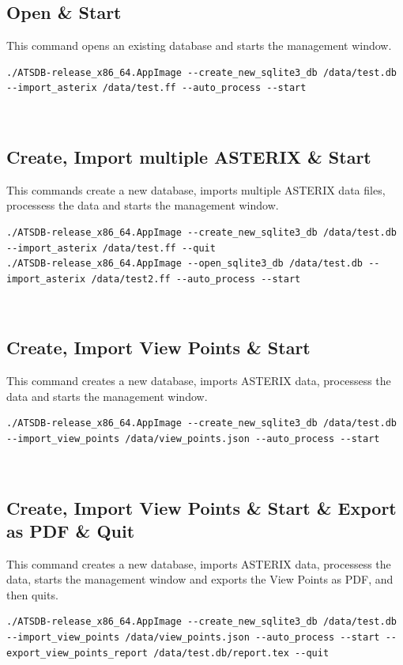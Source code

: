 \subsection{Open \& Start}

This command opens an existing database and starts the management window.

\begin{lstlisting}
./ATSDB-release_x86_64.AppImage --create_new_sqlite3_db /data/test.db --import_asterix /data/test.ff --auto_process --start
\end{lstlisting}
\ \\

\subsection{Create, Import multiple ASTERIX \& Start}

This commands create a new database, imports multiple ASTERIX data files, processess the data and starts the management window.

\begin{lstlisting}
./ATSDB-release_x86_64.AppImage --create_new_sqlite3_db /data/test.db --import_asterix /data/test.ff --quit
./ATSDB-release_x86_64.AppImage --open_sqlite3_db /data/test.db --import_asterix /data/test2.ff --auto_process --start
\end{lstlisting}
\ \\

\subsection{Create, Import View Points \& Start}

This command creates a new database, imports ASTERIX data, processess the data and starts the management window.

\begin{lstlisting}
./ATSDB-release_x86_64.AppImage --create_new_sqlite3_db /data/test.db --import_view_points /data/view_points.json --auto_process --start
\end{lstlisting}
\ \\

\subsection{Create, Import View Points \& Start \& Export as PDF \& Quit}

This command creates a new database, imports ASTERIX data, processess the data, starts the management window and exports the View Points as PDF, and then quits.

\begin{lstlisting}
./ATSDB-release_x86_64.AppImage --create_new_sqlite3_db /data/test.db --import_view_points /data/view_points.json --auto_process --start --export_view_points_report /data/test.db/report.tex --quit
\end{lstlisting}
\ \\
